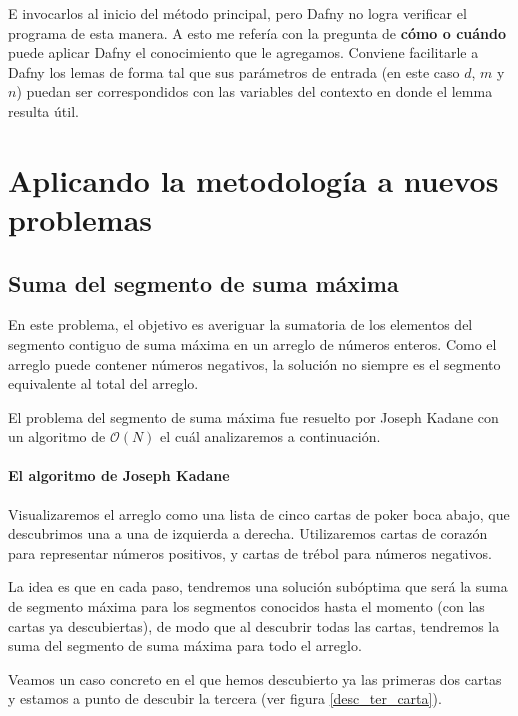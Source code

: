 \documentclass[12pt, a4paper, openany, fleqn]{book}
\newif\ifUsePstPoker
\begin{document}
    E invocarlos al inicio del método principal, pero Dafny no logra verificar el programa de esta manera. A esto me refería con la pregunta de \textbf{cómo o cuándo} puede aplicar Dafny el conocimiento que le agregamos. Conviene facilitarle a Dafny los lemas de forma tal que sus parámetros de entrada (en este caso $d$, $m$ y $n$) puedan ser correspondidos con las variables del contexto en donde el lemma resulta útil.

    \chapter{Aplicando la metodología a nuevos problemas}

    \section{Suma del segmento de suma máxima}

    En este problema, el objetivo es averiguar la sumatoria de los elementos del segmento contiguo de suma máxima en un arreglo de números enteros.
    Como el arreglo puede contener números negativos, la solución no siempre es el segmento equivalente al total del arreglo.

    El problema del segmento de suma máxima fue resuelto por Joseph Kadane con un algoritmo de $\mathcal{O}(N)$ el cuál analizaremos a continuación.

    \subsubsection*{El algoritmo de Joseph Kadane}
    Visualizaremos el arreglo como una lista de cinco cartas de poker boca abajo, que descubrimos una a una de izquierda a derecha. Utilizaremos cartas de corazón para representar números positivos, y cartas de trébol para números negativos.

    La idea es que en cada paso, tendremos una solución subóptima que será la suma de segmento máxima para los segmentos conocidos hasta el momento (con las cartas ya descubiertas), de modo que al descubrir todas las cartas, tendremos la suma del segmento de suma máxima para todo el arreglo.

    Veamos un caso concreto en el que hemos descubierto ya las primeras dos cartas y estamos a punto de descubir la tercera (ver figura \ref{desc_ter_carta}).

    \ifUsePstPoker
        \begin{figure}[h]
            \centering
            \psset{framebg=beige}\crdsevh
            \psset{framebg=beige}\crdtwoh
            \psset{backcolor=red}\crdback
            \psset{backcolor=red}\crdback
            \psset{backcolor=red}\crdback
            \rput(-8.2,-1){\textbf{\^}} %

            \caption{Descubriendo la tercera carta} \label{desc_ter_carta}
        \end{figure}
    \fi
\end{document}
